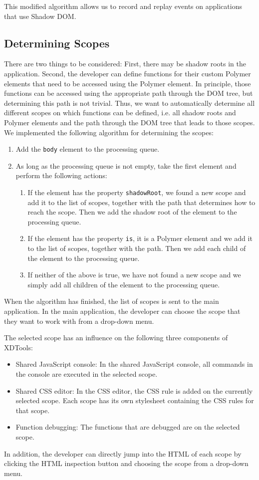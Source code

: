 This modified algorithm allows us to record and replay events on applications that use Shadow DOM. 

\subsection{Determining Scopes}

There are two things to be considered: First, there may be shadow roots in the application. Second, the developer can define functions for their custom Polymer elements that need to be accessed using the Polymer element. In principle, those functions can be accessed using the appropriate path through the DOM tree, but determining this path is not trivial. Thus, we want to automatically determine all different scopes on which functions can be defined, i.e. all shadow roots and Polymer elements and the path through the DOM tree that leads to those scopes. We implemented the following algorithm for determining the scopes:
\begin{enumerate}
	\item Add the \lstinline|body| element to the processing queue.
	\item As long as the processing queue is not empty, take the first element and perform the following actions:
	\begin{enumerate}
		\item If the element has the property \lstinline|shadowRoot|, we found a new scope and add it to the list of scopes, together with the path that determines how to reach the scope. Then we add the shadow root of the element to the processing queue.
		\item If the element has the property \lstinline|is|, it is a Polymer element and we add it to the list of scopes, together with the path. Then we add each child of the element to the processing queue.
		\item If neither of the above is true, we have not found a new scope and we simply add all children of the element to the processing queue.
	\end{enumerate}
\end{enumerate}
When the algorithm has finished, the list of scopes is sent to the main application. In the main application, the developer can choose the scope that they want to work with from a drop-down menu.

The selected scope has an influence on the following three components of XDTools:
\begin{itemize}
	\item Shared JavaScript console: In the shared JavaScript console, all commands in the console are executed in the selected scope. 
	\item Shared CSS editor: In the CSS editor, the CSS rule is added on the currently selected scope. Each scope has its own stylesheet containing the CSS rules for that scope.
	\item Function debugging: The functions that are debugged are on the selected scope.
\end{itemize}
In addition, the developer can directly jump into the HTML of each scope by clicking the HTML inspection button and choosing the scope from a drop-down menu.